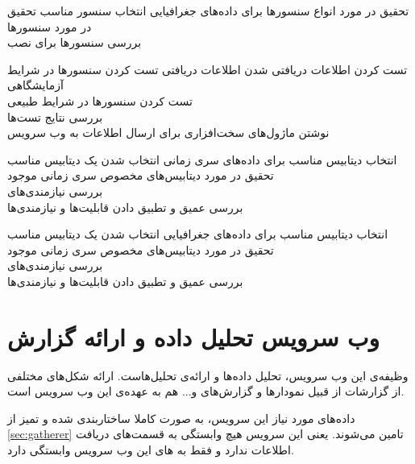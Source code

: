 \begin{wbsbox}{}
\begin{wbssub}
{تحقیق در مورد انواع سنسور‌ها برای داده‌های جغرافیایی}
{انتخاب سنسور مناسب}
\task
تحقیق در مورد سنسور‌ها \\
\task
بررسی سنسور‌ها برای نصب
\end{wbssub}

\begin{wbssub}
{تست کردن اطلاعات دریافتی}
{ شدن اطلاعات دریافتی}
\task
تست کردن سنسورها در شرایط آزمایشگاهی \\
\task
تست کردن سنسورها در شرایط طبیعی \\
\task
بررسی نتایج تست‌ها \\
\task
نوشتن ماژول‌های سخت‌افزاری برای ارسال اطلاعات به وب ‌سرویس
\end{wbssub}

\begin{wbssub}
{انتخاب دیتابیس مناسب برای داده‌های سری زمانی}
{انتخاب شدن یک دیتابیس مناسب}
\task
تحقیق در مورد دیتابیس‌‌های مخصوص سری زمانی موجود \\
\task
بررسی نیازمندی‌های 
 \\
\task
بررسی عمیق و تطبیق‌ دادن قابلیت‌ها و نیازمندی‌ها \\
\end{wbssub}

\begin{wbssub}
{انتخاب دیتابیس مناسب برای داده‌های جغرافیایی}
{انتخاب شدن یک دیتابیس مناسب}
\task
تحقیق در مورد دیتابیس‌‌های مخصوص سری زمانی موجود \\
\task
بررسی نیازمندی‌های 
 \\
\task
بررسی عمیق و تطبیق‌ دادن قابلیت‌ها و نیازمندی‌ها
\end{wbssub}
\end{wbsbox}

\section{وب سرویس تحلیل داده و ارائه گزارش}\label{sec:processor}
وظیفه‌ی این وب‌ سرویس، تحلیل‌ داده‌ها و ارائه‌ی تحلیل‌هاست. ارائه شکل‌‌های مختلفی از گزارشات از قبیل نمودار‌ها و گزارش‌های 
و... هم به عهده‌ی این وب سرویس است.

داده‌های مورد نیاز این سرویس، به صورت کاملا ساختاربندی شده و تمیز از
\ref{sec:gatherer}
تامین می‌شوند. یعنی این سرویس هیچ وابستگی به قسمت‌های دریافت اطلاعات  ندارد و فقط به ‌های این وب سرویس وابستگی دارد.

